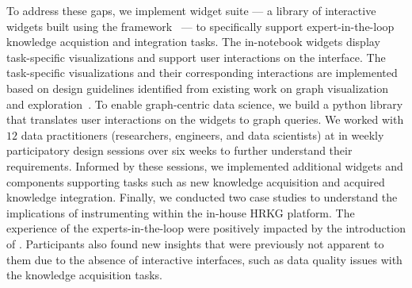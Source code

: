 To address these gaps, we implement \system widget suite --- a library of interactive widgets built using the \basesystem framework~\cite{choi2023towards} --- to specifically support expert-in-the-loop knowledge acquistion and integration tasks. The in-notebook widgets display task-specific visualizations and support user interactions on the interface. The task-specific visualizations and their corresponding interactions are implemented based on design guidelines identified from existing work on graph visualization and exploration~\cite{liu2018graph, 2019_eurovis_mvnv, pienta2015scalable, pretorius2014tasks, kerracher2015task, ahn2013task, lee2006task}. To enable graph-centric data science, we build a python library that translates user interactions on the widgets to graph queries. 
We worked with $12$ data practitioners (\eg researchers, engineers, and data scientists) at \company in weekly participatory design sessions over six weeks to further understand their requirements. Informed by these sessions, we implemented additional \system widgets and components
supporting tasks such as new knowledge acquisition and acquired knowledge integration. Finally, we conducted two case studies to understand the implications of instrumenting \system within the in-house HRKG platform. The experience of the experts-in-the-loop were positively impacted by the introduction of \system. Participants also found new insights that were previously not apparent to them due to the absence of interactive interfaces, such as data quality issues with the knowledge acquisition tasks.

